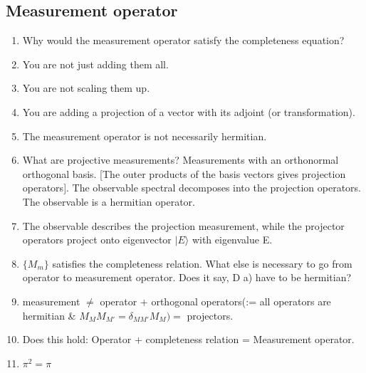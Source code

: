 \documentclass[a4paper,12pt]{amsbook}
\newcommand{\0}{{$|0\rangle$}}
\newcommand{\1}{{$|1\rangle$}}
\begin{document}
\subsection{Measurement operator}
\begin{enumerate}
    \item Why would the measurement operator satisfy the completeness equation? 
    \item You are not just adding them all. 
    \item You are not scaling them up. 
    \item You are adding a projection of a vector with its adjoint (or transformation). 
    \item The measurement operator is not necessarily hermitian. 
    \item What are projective measurements? Measurements with an orthonormal orthogonal basis. [The outer products of the basis vectors gives projection operators]. The observable spectral decomposes into the projection operators. The observable is a hermitian operator. 
    \item The observable describes the projection measurement, while the projector operators project onto eigenvector $|E\rangle$ with eigenvalue E. \
    \item $\{M_m\}$ satisfies the completeness relation. What else is necessary to go from operator to measurement operator. Does it say, D a) have to be hermitian? 
    \item measurement $\neq$ operator + orthogonal operators(:= all operators are hermitian \& $ M_M M_{M'} = \delta_{MM'} M_M) = $ projectors. 
    \item Does this hold: Operator + completeness relation = Measurement operator.
    \item $\pi^2 = \pi$
\end{enumerate}
    
\end{document}
